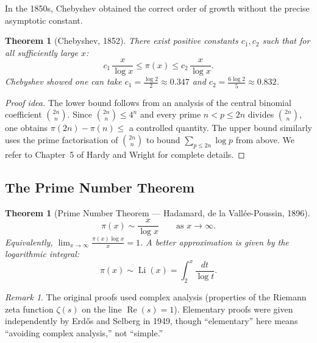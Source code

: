 \documentclass[12pt,a4paper,openany]{book}
\theoremstyle{definition}
\theoremstyle{plain}
\newtheorem{theorem}[definition]{Theorem}
\theoremstyle{remark}
\newtheorem{remark}[definition]{Remark}
\begin{document}
In the 1850s, Chebyshev obtained the correct order of growth without the
precise asymptotic constant.

\begin{theorem}[Chebyshev, 1852]
\label{thm:chebyshev}
There exist positive constants $c_1, c_2$ such that for all sufficiently
large $x$:
\[
  c_1 \,\frac{x}{\log x} \le \pi(x) \le c_2 \,\frac{x}{\log x}.
\]
Chebyshev showed one can take $c_1 = \frac{\log 2}{2} \approx 0.347$ and
$c_2 = \frac{6 \log 2}{5} \approx 0.832$.
\end{theorem}

\begin{proof}[Proof idea]
The lower bound follows from an analysis of the central binomial coefficient
$\binom{2n}{n}$. Since $\binom{2n}{n} \le 4^n$ and every prime
$n < p \le 2n$ divides $\binom{2n}{n}$, one obtains $\pi(2n) - \pi(n) \le$
a controlled quantity. The upper bound similarly uses the prime factorisation
of $\binom{2n}{n}$ to bound $\sum_{p \le 2n} \log p$ from above. We refer
to Chapter~5 of Hardy and Wright for complete details.
\end{proof}

\subsection{The Prime Number Theorem}
\label{subsec:pnt}

\begin{theorem}[Prime Number Theorem --- Hadamard, de la Vall\'{e}e-Poussin, 1896]
\label{thm:pnt}
\[
  \pi(x) \sim \frac{x}{\log x}
  \qquad\text{as } x \to \infty.
\]
Equivalently, $\displaystyle\lim_{x \to \infty} \frac{\pi(x) \log x}{x} = 1$.
A better approximation is given by the \emph{logarithmic integral}:
\[
  \pi(x) \sim \operatorname{Li}(x) = \int_2^{x} \frac{dt}{\log t}.
\]
\end{theorem}

\begin{remark}
\label{rem:pnt-proof}
The original proofs used complex analysis (properties of the Riemann zeta
function $\zeta(s)$ on the line $\operatorname{Re}(s) = 1$). Elementary proofs
were given independently by Erd\H{o}s and Selberg in 1949, though ``elementary''
here means ``avoiding complex analysis,'' not ``simple.''
\end{remark}
\end{document}
